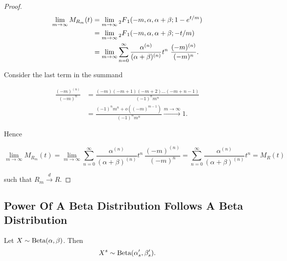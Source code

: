 \documentclass[../../main.tex]{subfiles}
\begin{document}
\begin{proof}
    \begin{equation}
        \begin{split}
            \lim_{m \rightarrow \infty} M_{R_m}(t) &= \lim_{m \rightarrow \infty} \prescript{}{2}{F}_1(-m, \alpha, \alpha + \beta; 1 - e^{t / m})\\
            &= \lim_{m \rightarrow \infty} \prescript{}{2}{F}_1(-m, \alpha, \alpha + \beta; - t/ m) \\
            &= \lim_{m \rightarrow \infty}\sum^{\infty}_{n=0} \frac{\alpha^{(n)}}{(\alpha + \beta)^{(n)}} t^n \  \frac{(-m)^{(n)}}{(-m)^n}.
        \end{split}
    \end{equation}

    
    Consider the last term in the summand 

    \begin{equation}
        \begin{split}
            \frac{(-m)^{(n)}}{(-m)^n} &= \frac{(-m)(-m + 1)(-m + 2)\ldots(-m + n - 1)}{(-1)^n m^n} \\
            &= \frac{(-1)^n m^n + o((-m)^{m - 1})}{(-1)^n m^n} \xrightarrow{m\rightarrow \infty} 1.
        \end{split}
    \end{equation}

    Hence 

    \begin{equation}
        \lim_{m \rightarrow \infty} M_{R_m}(t) = \lim_{m \rightarrow \infty}\sum^{\infty}_{n=0} \frac{\alpha^{(n)}}{(\alpha + \beta)^{(n)}} t^n \  \frac{(-m)^{(n)}}{(-m)^n} = \sum^{\infty}_{n=0} \frac{\alpha^{(n)}}{(\alpha + \beta)^{(n)}} t^n = M_R(t)
    \end{equation}

    such that $R_m \xrightarrow{d} R$.
\end{proof}

\subsection{Power Of A Beta Distribution Follows A Beta Distribution}

\begin{lemma}
    Let $X \sim \text{Beta}(\alpha, \beta)$. Then \begin{equation}
        X^s \sim \text{Beta}(\alpha'_s, \beta'_s).
    \end{equation}
\end{lemma}
\end{document}
